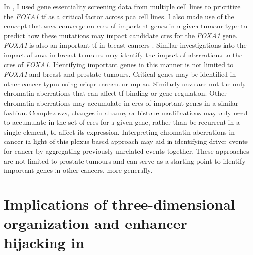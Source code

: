 In , I used gene essentiality screening data from multiple cell lines to prioritize the \emph{FOXA1} \gls{tf} as a critical factor across \gls{pca} cell lines.
I also made use of the concept that \glspl{snv} converge on \glspl{cre} of important genes in a given tumour type to predict how these mutations may impact candidate \glspl{cre} for the \emph{FOXA1} gene.
\emph{FOXA1} is also an important \gls{tf} in breast cancers .
Similar investigations into the impact of \glspl{snv} in breast tumours may identify the impact of aberrations to the \glspl{cre} of \emph{FOXA1}.
Identifying important genes in this manner is not limited to \emph{FOXA1} and breast and prostate tumours.
Critical genes may be identified in other cancer types using \gls{crispr} screens or \glspl{mpra}.
Similarly \glspl{snv} are not the only chromatin aberrations that can affect \gls{tf} binding or gene regulation.
Other chromatin aberrations may accumulate in \glspl{cre} of important genes in a similar fashion.
Complex \glspl{sv}, changes in \gls{dname}, or histone modifications may only need to accumulate in the set of \glspl{cre} for a given gene, rather than be recurrent in a single element, to affect its expression.
Interpreting chromatin aberrations in cancer in light of this plexus-based approach may aid in identifying driver events for cancer by aggregating previously unrelated events together.
These approaches are not limited to prostate tumours and can serve as a starting point to identify important genes in other cancers, more generally.

\section{Implications of three-dimensional organization and enhancer hijacking in }

